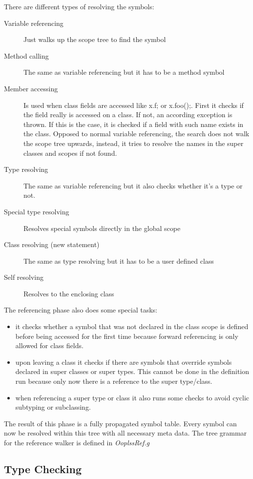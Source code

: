 There are different types of resolving the symbols:
\begin{description}
\item[Variable referencing]
Just walks up the scope tree to find the symbol 
\item[Method calling]
The same as variable referencing but it has to be a method symbol
\item[Member accessing]
Is used when class fields are accessed like x.f; or x.foo();. First it checks
if the field really is accessed on a class. If not, an according exception
is thrown. If this is the case, it is checked if a field with such name exists
in the class. Opposed to normal variable referencing, the search does not walk
the scope tree upwards, instead, it tries to resolve the names in the super classes
and scopes if not found.
\item[Type resolving]
The same as variable referencing but it also checks whether it's a type or not.
\item[Special type resolving]
Resolves special symbols directly in the global scope
\item[Class resolving (new statement)]
The same as type resolving but it has to be a user defined class
\item[Self resolving]
Resolves to the enclosing class
\end{description}

The referencing phase also does some special tasks:
\begin{itemize}
\item it checks whether a symbol that was not declared in the class scope is defined 
before being accessed for the first time because forward referencing is only 
allowed for class fields.
\item upon leaving a class it checks if there are symbols that override symbols
declared in super classes or super types. This cannot be done in the definition run
because only now there is a reference to the super type/class.
\item when referencing a super type or class it also runs some checks to avoid
cyclic subtyping or subclassing.
\end{itemize}

The result of this phase is a fully propagated symbol table. Every symbol can
now be resolved within this tree with all necessary meta data. The tree grammar
for the reference walker is defined in \emph{OoplssRef.g}

\subsection{Type Checking}

